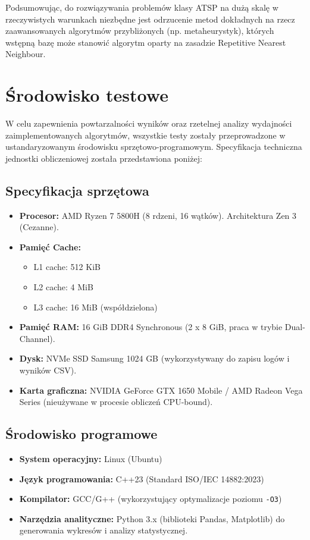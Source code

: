 \documentclass[12pt, a4paper]{article}
\begin{document}
Podsumowując, do rozwiązywania problemów klasy ATSP na dużą skalę w rzeczywistych warunkach niezbędne jest odrzucenie metod dokładnych na rzecz zaawansowanych algorytmów przybliżonych (np. metaheurystyk), których wstępną bazę może stanowić algorytm oparty na zasadzie Repetitive Nearest Neighbour.	
	

\newpage

\section{Środowisko testowe}
W celu zapewnienia powtarzalności wyników oraz rzetelnej analizy wydajności zaimplementowanych algorytmów, wszystkie testy zostały przeprowadzone w ustandaryzowanym środowisku sprzętowo-programowym. Specyfikacja techniczna jednostki obliczeniowej została przedstawiona poniżej:

\subsection{Specyfikacja sprzętowa}
\begin{itemize}
	\item \textbf{Procesor:} AMD Ryzen 7 5800H (8 rdzeni, 16 wątków). Architektura Zen 3 (Cezanne).
	\item \textbf{Pamięć Cache:}
	\begin{itemize}
		\item L1 cache: 512 KiB
		\item L2 cache: 4 MiB
		\item L3 cache: 16 MiB (współdzielona)
	\end{itemize}
	\item \textbf{Pamięć RAM:} 16 GiB DDR4 Synchronous (2 x 8 GiB, praca w trybie Dual-Channel).
	\item \textbf{Dysk:} NVMe SSD Samsung 1024 GB (wykorzystywany do zapisu logów i wyników CSV).
	\item \textbf{Karta graficzna:} NVIDIA GeForce GTX 1650 Mobile / AMD Radeon Vega Series (nieużywane w procesie obliczeń CPU-bound).
\end{itemize}

\subsection{Środowisko programowe}
\begin{itemize}
	\item \textbf{System operacyjny:} Linux (Ubuntu) 
	\item \textbf{Język programowania:} C++23 (Standard ISO/IEC 14882:2023)
	\item \textbf{Kompilator:} GCC/G++ (wykorzystujący optymalizacje poziomu \texttt{-O3})
	\item \textbf{Narzędzia analityczne:} Python 3.x (biblioteki Pandas, Matplotlib) do generowania wykresów i analizy statystycznej.
\end{itemize}


	
	
\end{document}
